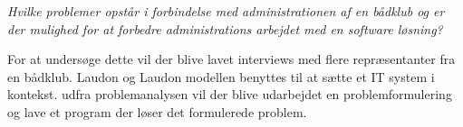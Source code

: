 \textit{Hvilke problemer opstår i forbindelse med administrationen af en bådklub og er der mulighed for at forbedre administrations arbejdet med en software løsning?}

For at undersøge dette vil der blive lavet interviews med flere repræsentanter fra en bådklub. Laudon og Laudon modellen benyttes til at sætte et IT system i kontekst. udfra problemanalysen vil der blive udarbejdet en problemformulering og lave et program der løser det formulerede problem.
